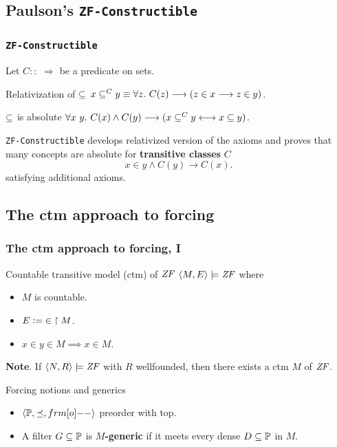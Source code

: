 \documentclass[english]{beamer}
\begin{document}
\subsection{Paulson's \texttt{ZF-Constructible}}

\begin{frame}
  \frametitle{\texttt{ZF-Constructible} \citep{paulson_2003}}
  Let $C :: {}$  $\Rightarrow$  be a predicate on sets.
  \pause
  \begin{block}{Relativization of $\subseteq$}
    $x \subseteq^C y \equiv \forall z.\ C(z) \longrightarrow (z\in x
    \longrightarrow z\in y)$.
  \end{block}
  \pause
  \begin{block}{$\subseteq$ is absolute}
    $\forall x\ y.\ C(x) \land C(y) \longrightarrow (x \subseteq^C y
    \longleftrightarrow x\subseteq y)$.
  \end{block}
  \pause 
  \texttt{ZF-Constructible} develops relativized version of the axioms
  and proves that many concepts are absolute for \textbf{transitive
    classes} $C$
  \[
  x\in y \land C(y)  \longrightarrow C(x).
  \]
  satisfying additional axioms.
\end{frame}


\subsection{The ctm approach to forcing}

\begin{frame}
  \frametitle{The ctm approach to forcing, I}
  \begin{block}{Countable transitive model (ctm) of $\mathit{ZF}$}
    $\langle M, E\rangle \models \mathit{ZF}$ where
    \begin{itemize}
    \item $M$ is countable.
    \item $E \mathrel{\mathop:}= {\in}\restriction M$.
    \item $x\in y \in M \implies x\in M$.
    \end{itemize}
  \end{block}
  \pause%
  \textbf{Note}. If $\langle N, R\rangle \models \mathit{ZF}$ with $R$ wellfounded, then there
  exists a ctm $M$ of $\mathit{ZF}$.
  \pause
  \begin{block}{Forcing notions and generics}
    \begin{itemize}
    \item $\lb \PP, {\preceq} ,\1\rb$ preorder with top.
    \item A filter $G\subseteq \mathbb{P}$ is \textbf{$M$-generic} if it meets
      every dense $D\subseteq \mathbb{P}$ in $M$.
    \end{itemize}
  \end{block}
\end{frame}
\end{document}
